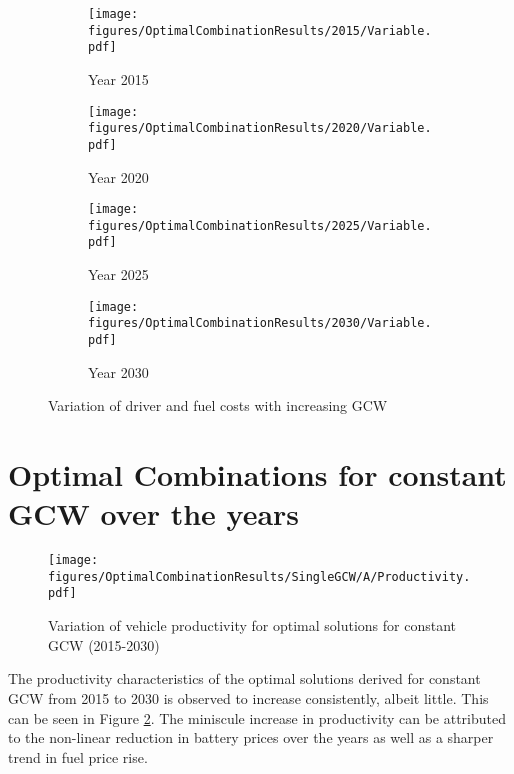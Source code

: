 \documentclass[ExampleMasters.tex]{subfiles}
\begin{document}
\begin{figure}[ht!]
\begin{subfigure}{.5\textwidth}
\centering
\texttt{[image: figures/OptimalCombinationResults/2015/Variable.pdf]}
\caption{Year 2015}
\end{subfigure}
\begin{subfigure}{.5\textwidth}
\centering
\texttt{[image: figures/OptimalCombinationResults/2020/Variable.pdf]}
\caption{Year 2020}
\end{subfigure}
\begin{subfigure}{.5\textwidth}
\centering
\texttt{[image: figures/OptimalCombinationResults/2025/Variable.pdf]}
\caption{Year 2025}
\end{subfigure}
\begin{subfigure}{.5\textwidth}
\centering
\texttt{[image: figures/OptimalCombinationResults/2030/Variable.pdf]}
\caption{Year 2030}
\end{subfigure}
\caption{Variation of driver and fuel costs with increasing GCW}
\label{variableCostVsGCWOverYears}
\end{figure}

\newpage

\section{Optimal Combinations for constant GCW over the years}

\begin{figure}[ht!]
\centering
\texttt{[image: figures/OptimalCombinationResults/SingleGCW/A/Productivity.pdf]}
\caption{Variation of vehicle productivity for optimal solutions for constant GCW (2015-2030)}
\label{prodConstGCWOverYears}
\end{figure}

The productivity characteristics of the optimal solutions derived for constant GCW from 2015 to 2030 is observed to increase consistently, albeit little. This can be seen in Figure \ref{prodConstGCWOverYears}. The miniscule increase in productivity can be attributed to the non-linear reduction in battery prices over the years as well as a sharper trend in fuel price rise.\\
\end{document}
